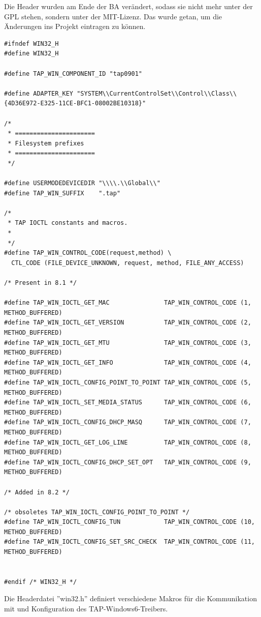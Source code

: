 Die Header wurden am Ende der \ac{BA} verändert, sodass sie nicht mehr unter der GPL stehen,
sondern unter der MIT-Lizenz. Das wurde getan, um die Änderungen ins Projekt eintragen zu können.

\begin{lstlisting}[caption=win32.h-Headerdatei für den TAP-Windows6-Treiber,label=win32.h]
#ifndef WIN32_H
#define WIN32_H

#define TAP_WIN_COMPONENT_ID "tap0901"

#define ADAPTER_KEY "SYSTEM\\CurrentControlSet\\Control\\Class\\{4D36E972-E325-11CE-BFC1-08002BE10318}"

/*
 * ======================
 * Filesystem prefixes
 * ======================
 */

#define USERMODEDEVICEDIR "\\\\.\\Global\\"
#define TAP_WIN_SUFFIX    ".tap"

/*
 * TAP IOCTL constants and macros.
 *
 */
#define TAP_WIN_CONTROL_CODE(request,method) \
  CTL_CODE (FILE_DEVICE_UNKNOWN, request, method, FILE_ANY_ACCESS)

/* Present in 8.1 */

#define TAP_WIN_IOCTL_GET_MAC               TAP_WIN_CONTROL_CODE (1, METHOD_BUFFERED)
#define TAP_WIN_IOCTL_GET_VERSION           TAP_WIN_CONTROL_CODE (2, METHOD_BUFFERED)
#define TAP_WIN_IOCTL_GET_MTU               TAP_WIN_CONTROL_CODE (3, METHOD_BUFFERED)
#define TAP_WIN_IOCTL_GET_INFO              TAP_WIN_CONTROL_CODE (4, METHOD_BUFFERED)
#define TAP_WIN_IOCTL_CONFIG_POINT_TO_POINT TAP_WIN_CONTROL_CODE (5, METHOD_BUFFERED)
#define TAP_WIN_IOCTL_SET_MEDIA_STATUS      TAP_WIN_CONTROL_CODE (6, METHOD_BUFFERED)
#define TAP_WIN_IOCTL_CONFIG_DHCP_MASQ      TAP_WIN_CONTROL_CODE (7, METHOD_BUFFERED)
#define TAP_WIN_IOCTL_GET_LOG_LINE          TAP_WIN_CONTROL_CODE (8, METHOD_BUFFERED)
#define TAP_WIN_IOCTL_CONFIG_DHCP_SET_OPT   TAP_WIN_CONTROL_CODE (9, METHOD_BUFFERED)

/* Added in 8.2 */

/* obsoletes TAP_WIN_IOCTL_CONFIG_POINT_TO_POINT */
#define TAP_WIN_IOCTL_CONFIG_TUN            TAP_WIN_CONTROL_CODE (10, METHOD_BUFFERED)
#define TAP_WIN_IOCTL_CONFIG_SET_SRC_CHECK  TAP_WIN_CONTROL_CODE (11, METHOD_BUFFERED)


#endif /* WIN32_H */
\end{lstlisting}
Die Headerdatei ''win32.h'' definiert verschiedene Makros für die Kommunikation mit und Konfiguration
des TAP-Windows6-Treibers.

